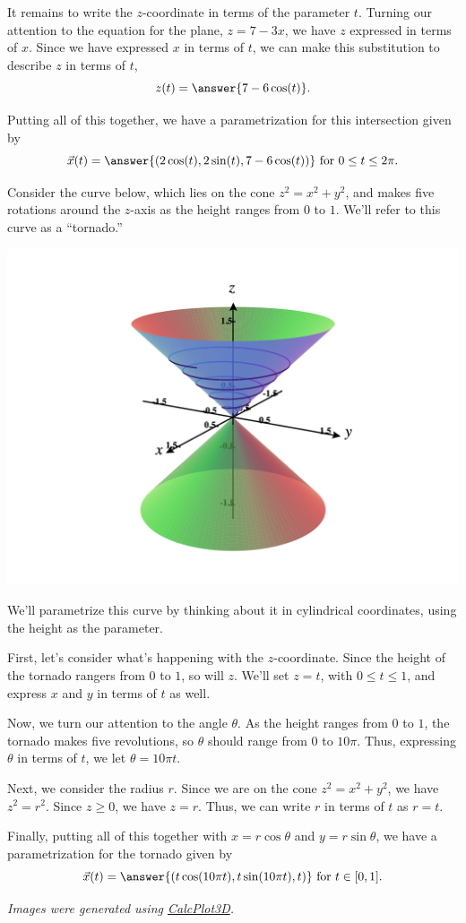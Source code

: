 \documentclass{ximera}
\begin{document}
\begin{example}
It remains to write the $z$-coordinate in terms of the parameter $t$. Turning our attention to the equation for the plane, $z = 7-3x$, we have $z$ expressed in terms of $x$. Since we have expressed $x$ in terms of $t$, we can make this substitution to describe $z$ in terms of $t$,
\[
z(t) = \answer{7-6\cos(t)}.
\]

Putting all of this together, we have a parametrization for this intersection given by
\[
\vec{x}(t) = \answer{(2\cos(t),2\sin(t),7-6\cos(t))} \textrm{ for } 0\leq t\leq 2\pi.
\]

\end{example}

\begin{example}
Consider the curve below, which lies on the cone $z^2 = x^2 + y^2$, and makes five rotations around the $z$-axis as the height ranges from $0$ to $1$. We'll refer to this curve as a ``tornado.''

\begin{image}
\includegraphics[width=\textwidth]{CalcPlot3D-tornado}
\end{image}

We'll parametrize this curve by thinking about it in cylindrical coordinates, using the height as the parameter.

First, let's consider what's happening with the $z$-coordinate. Since the height of the tornado rangers from $0$ to $1$, so will $z$. We'll set $z = t$, with $0\leq t\leq 1$, and express $x$ and $y$ in terms of $t$ as well.

Now, we turn our attention to the angle $\theta$. As the height ranges from $0$ to $1$, the tornado makes five revolutions, so $\theta$ should range from $0$ to $10\pi$. Thus, expressing $\theta$ in terms of $t$, we let $\theta = 10\pi t$.

Next, we consider the radius $r$. Since we are on the cone $z^2 = x^2 + y^2$, we have $z^2 = r^2$. Since $z\geq 0$, we have $z = r$. Thus, we can write $r$ in terms of $t$ as $r = t$.

Finally, putting all of this together with $x = r\cos\theta$ and $y = r\sin\theta$, we have a parametrization for the tornado given by
\[
\vec{x}(t) = \answer{(t\cos(10\pi t), t\sin(10\pi t), t)} \textrm{ for } t\in [0,1].
\]

\end{example}

\textit{Images were generated using \href{https://www.monroecc.edu/faculty/paulseeburger/calcnsf/CalcPlot3D/}{CalcPlot3D}.}
\end{document}
